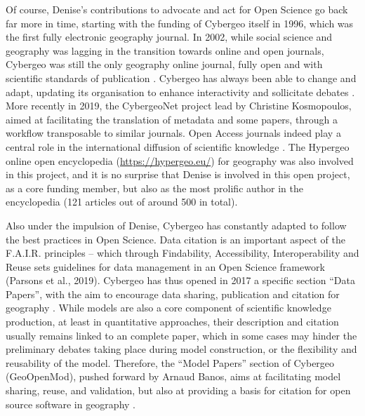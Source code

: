 \documentclass[11pt]{article}
\begin{document}
Of course, Denise’s contributions to advocate and act for Open Science go back far more in time, starting with the funding of Cybergeo itself in 1996, which was the first fully electronic geography journal. In 2002, while social science and geography was lagging in the transition towards online and open journals, Cybergeo was still the only geography online journal, fully open and with scientific standards of publication \citep{kosmopoulos2002cybergeo}. Cybergeo has always been able to change and adapt, updating its organisation to enhance interactivity and sollicitate debates \citep{pumain1999cybergeo}. More recently in 2019, the CybergeoNet project lead by Christine Kosmopoulos, aimed at facilitating the translation of metadata and some papers, through a workflow transposable to similar journals. Open Access journals indeed play a central role in the international diffusion of scientific knowledge \citep{pumain2022role}. The Hypergeo online open encyclopedia (\url{https://hypergeo.eu/}) for geography was also involved in this project, and it is no surprise that Denise is involved in this open project, as a core funding member, but also as the most prolific author in the encyclopedia (121 articles out of around 500 in total).



Also under the impulsion of Denise, Cybergeo has constantly adapted to follow the best practices in Open Science. Data citation is an important aspect of the F.A.I.R. principles – which through Findability, Accessibility, Interoperability and Reuse sets guidelines for data management in an Open Science framework (Parsons et al., 2019). Cybergeo has thus opened in 2017 a specific section ``Data Papers'', with the aim to encourage data sharing, publication and citation for geography \citep{pumain2017expressions}. While models are also a core component of scientific knowledge production, at least in quantitative approaches, their description and citation usually remains linked to an complete paper, which in some cases may hinder the preliminary debates taking place during model construction, or the flexibility and reusability of the model. Therefore, the ``Model Papers'' section of Cybergeo (GeoOpenMod), pushed forward by Arnaud Banos, aims at facilitating model sharing, reuse, and validation, but also at providing a basis for citation for open source software in geography \citep{banos2014introduction}.
\end{document}
